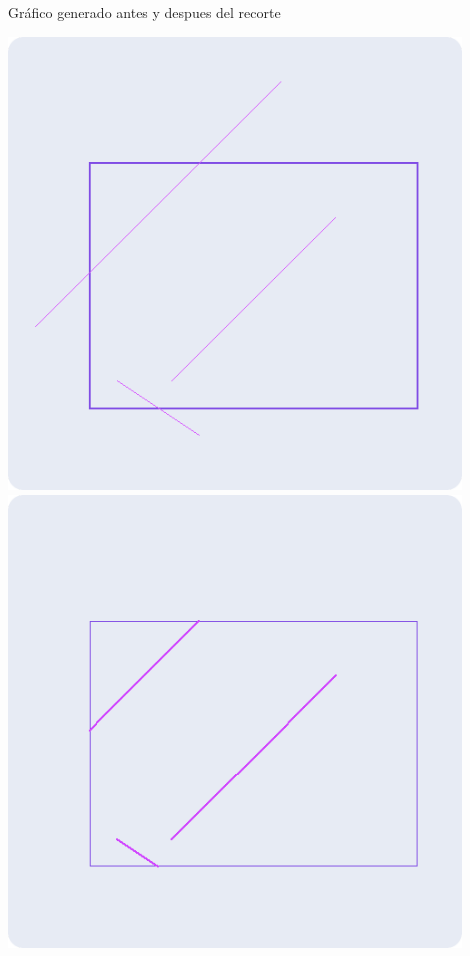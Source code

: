\documentclass[a4paper]{article}
\begin{document}
\newpage
Gráfico generado antes y despues del recorte
\begin{center}
    \includegraphics[width=12cm]{src/clipping1.png}\\[0.2cm]
\includegraphics[width=12cm]{src/clipping2.png}
\end{center}
\newpage
\end{document}
